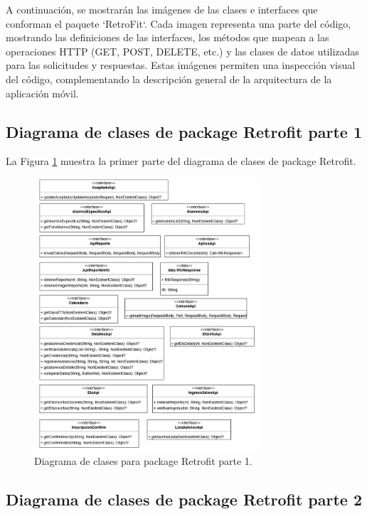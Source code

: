 A continuación, se mostrarán las imágenes de las clases e interfaces que conforman el paquete `RetroFit`. Cada imagen representa una parte del código, mostrando las definiciones de las interfaces, los métodos que mapean a las operaciones HTTP (GET, POST, DELETE, etc.) y las clases de datos utilizadas para las solicitudes y respuestas. Estas imágenes permiten una inspección visual del código, complementando la descripción general de la arquitectura de la aplicación móvil.

\newpage

\subsection{Diagrama de clases de package Retrofit parte 1}

La Figura \ref{fig:Retrofit1} muestra la primer parte del diagrama de clases de package Retrofit.

\begin{figure}[htbp!]
	\begin{center}
		\includegraphics[width=0.75\textwidth]{DiagramasMoviles/DCM (10)}
		\caption{Diagrama de clases para package Retrofit parte 1.}
		\label{fig:Retrofit1}
	\end{center}
\end{figure}

\newpage

\subsection{Diagrama de clases de package Retrofit parte 2}


